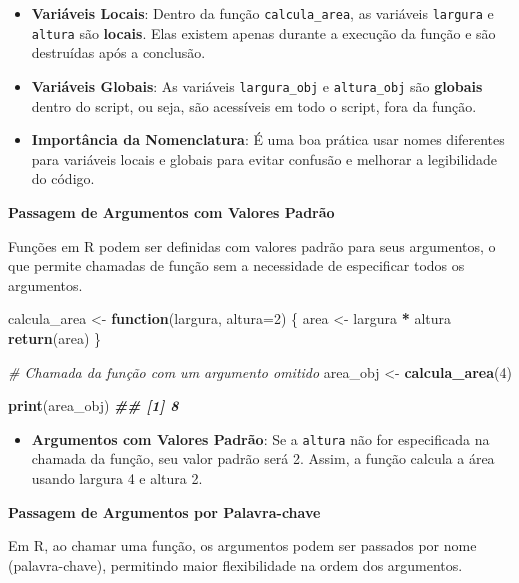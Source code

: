 \documentclass[
]{book}
\newenvironment{Shaded}{\begin{snugshade}}{\end{snugshade}}
\newcommand{\AttributeTok}[1]{\textcolor[rgb]{0.13,0.29,0.53}{#1}}
\newcommand{\CommentTok}[1]{\textcolor[rgb]{0.56,0.35,0.01}{\textit{#1}}}
\newcommand{\ControlFlowTok}[1]{\textcolor[rgb]{0.13,0.29,0.53}{\textbf{#1}}}
\newcommand{\DecValTok}[1]{\textcolor[rgb]{0.00,0.00,0.81}{#1}}
\newcommand{\DocumentationTok}[1]{\textcolor[rgb]{0.56,0.35,0.01}{\textbf{\textit{#1}}}}
\newcommand{\FunctionTok}[1]{\textcolor[rgb]{0.13,0.29,0.53}{\textbf{#1}}}
\newcommand{\NormalTok}[1]{#1}
\newcommand{\OtherTok}[1]{\textcolor[rgb]{0.56,0.35,0.01}{#1}}
\newcommand{\SpecialCharTok}[1]{\textcolor[rgb]{0.81,0.36,0.00}{\textbf{#1}}}
\providecommand{\tightlist}{%
  \setlength{\itemsep}{0pt}\setlength{\parskip}{0pt}}
\begin{document}
\begin{itemize}
\tightlist
\item
  \textbf{Variáveis Locais}: Dentro da função \texttt{calcula\_area}, as variáveis
  \texttt{largura} e \texttt{altura} são \textbf{locais}. Elas existem apenas durante a
  execução da função e são destruídas após a conclusão.
\item
  \textbf{Variáveis Globais}: As variáveis \texttt{largura\_obj} e \texttt{altura\_obj} são
  \textbf{globais} dentro do script, ou seja, são acessíveis em todo o
  script, fora da função.
\item
  \textbf{Importância da Nomenclatura}: É uma boa prática usar nomes
  diferentes para variáveis locais e globais para evitar confusão e
  melhorar a legibilidade do código.
\end{itemize}

\textbf{Passagem de Argumentos com Valores Padrão}

Funções em R podem ser definidas com valores padrão para seus
argumentos, o que permite chamadas de função sem a necessidade de
especificar todos os argumentos.

\begin{Shaded}
\begin{Highlighting}[]
\NormalTok{calcula\_area }\OtherTok{\textless{}{-}} \ControlFlowTok{function}\NormalTok{(largura, }\AttributeTok{altura=}\DecValTok{2}\NormalTok{) \{ }
\NormalTok{  area }\OtherTok{\textless{}{-}}\NormalTok{ largura }\SpecialCharTok{*}\NormalTok{ altura  }
  \FunctionTok{return}\NormalTok{(area)}
\NormalTok{\}}

\CommentTok{\# Chamada da função com um argumento omitido}
\NormalTok{area\_obj }\OtherTok{\textless{}{-}} \FunctionTok{calcula\_area}\NormalTok{(}\DecValTok{4}\NormalTok{) }

\FunctionTok{print}\NormalTok{(area\_obj)}
\DocumentationTok{\#\# [1] 8}
\end{Highlighting}
\end{Shaded}

\begin{itemize}
\tightlist
\item
  \textbf{Argumentos com Valores Padrão}: Se a \texttt{altura} não for
  especificada na chamada da função, seu valor padrão será 2. Assim, a
  função calcula a área usando largura 4 e altura 2.
\end{itemize}

\textbf{Passagem de Argumentos por Palavra-chave}

Em R, ao chamar uma função, os argumentos podem ser passados por nome
(palavra-chave), permitindo maior flexibilidade na ordem dos argumentos.
\end{document}
